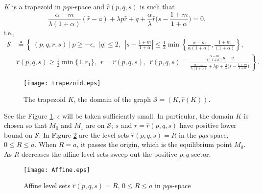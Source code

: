 \documentclass[a4paper,11pt]{article}
\theoremstyle{remark}
\begin{document}
$K$ is a trapezoid in $pqs$-space and $\hat{r}(p,q,s)$ is such that
\begin{equation}\frac{\alpha-m}{\lambda(1+\alpha)}(\hat{r}-a) + \lambda p\hat{r} + q +\frac{\alpha}{\lambda}\hat{r}\big(s- \frac{1+m}{1+\alpha}\big)=0, \label{eq:implicit} \end{equation}
i.e.,
\begin{align*}
 \mathcal{S} &\triangleq \left\{ \: (p,q,r,s) \: \big| \:  p\ge-\epsilon, ~~ |q|\le2, ~~ \left|s-\frac{1+m}{1+\alpha}\right| \le \frac{1}{2}\min\left\{\frac{\alpha-m}{\alpha(1+\alpha)},\frac{1+m}{(1+\alpha)}\right\}, \right. \\
 &\left. \hat{r}(p,q,s)\ge \frac{1}{2}\min\{1,r_1\},~~ r=\hat{r}(p,q,s), ~~\hat{r}(p,q,s) = \frac{ \frac{\alpha-m}{\lambda(1+\alpha)}a - q }{  \frac{\alpha-m}{\lambda(1+\alpha)} + \lambda p + \frac{\alpha}{\lambda}\big(s- \frac{1+m}{1+\alpha}\big)}\: \right\}.
\end{align*}
\begin{figure}
 \centering
  \texttt{[image: trapezoid.eps]}
  \caption{The trapezoid $K$, the domain of the graph $\mathcal{S} = (K,\hat{r}(K))$.} \label{fig:K}
\end{figure}
See the Figure \ref{fig:K}. $\epsilon$ will be taken sufficiently small. In particular, the domain $K$ is chosen so that $M_0$ and $M_1$ are on $\mathcal{S}$; $s$ and $r=\hat{r}(p,q,s)$ have positive lower bound on $\mathcal{S}$. In Figure \ref{fig:affine} are the level sets $\hat{r}(p,q,s)=R$ in the $pqs$-space, $0\le R\le a$. When $R=a$, it passes the origin, which is the equilibrium point $M_0$. As $R$ decreases the affine level sets sweep out the positive $p,q$ sector.

\begin{figure}
 \centering
%
  \texttt{[image: Affine.eps]}
  \caption{Affine level sets $\hat{r}(p,q,s)=R$, $0\le R\le a$  in $pqs$-space} \label{fig:affine}
\end{figure}
\end{document}
